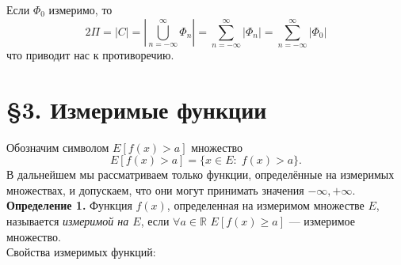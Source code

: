 \documentclass[12pt,a4paper, titlepage]{article}
\begin{document}
Если $\Phi_0$ измеримо, то 
$$2\Pi = |C| = |\bigcup\limits_{n = -\infty}^\infty \Phi_n| = \sum\limits_{n = -\infty}^\infty |\Phi_n| = \sum\limits_{n = -\infty}^\infty |\Phi_0|$$
что приводит нас к противоречию.








\section*{\S 3. Измеримые функции}

Обозначим символом $E[f(x) > a]$ множество
$$
E[f(x) > a] = \lbrace x \in E: \; f(x) > a \rbrace.
$$
В дальнейшем мы рассматриваем только функции, определённые на измеримых множествах, и допускаем, что они могут принимать значения $-\infty , +\infty$.\\

\textbf{Определение 1.} Функция $f(x)$, определенная на измеримом множестве $E$, называется \textit{измеримой на $E$}, если $\forall a \in \mathbb R$ $E[f(x) \geqslant a]$ --- измеримое множество.\\

Свойства измеримых функций:
\end{document}
